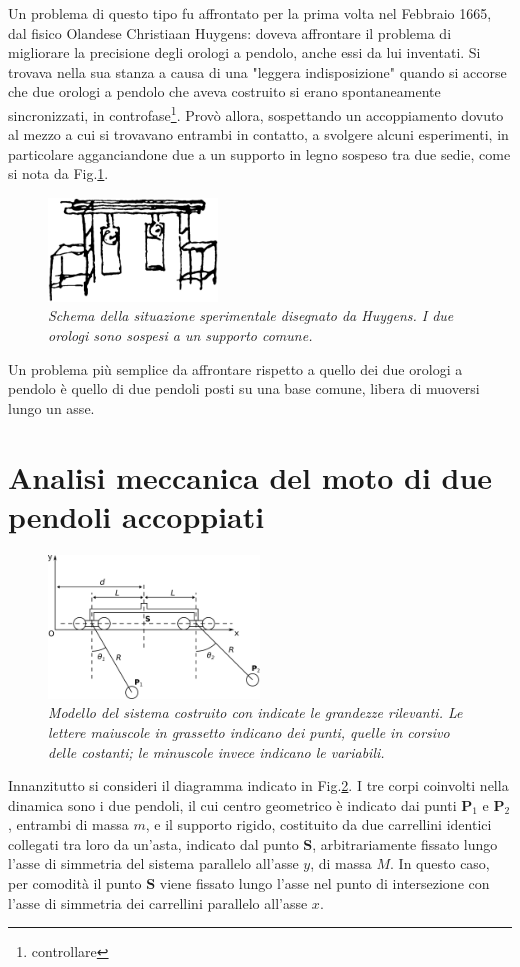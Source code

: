 \documentclass[11pt, a4paper, twoside]{article}
\begin{document}
Un problema di questo tipo fu affrontato per la prima volta nel Febbraio 1665, dal fisico Olandese Christiaan Huygens: doveva affrontare il problema di migliorare la precisione degli orologi a pendolo, anche essi da lui inventati. Si trovava nella sua stanza a causa di una "leggera indisposizione" quando si accorse che due orologi a pendolo che aveva costruito si erano spontaneamente sincronizzati, in controfase\footnote{controllare}. Provò allora, sospettando un accoppiamento dovuto al mezzo a cui si trovavano entrambi in contatto, a svolgere alcuni esperimenti, in particolare agganciandone due a un supporto in legno sospeso tra due sedie, come si nota da Fig.\ref{pendoli_huygens}.
\begin{figure}
    \centering
    \includegraphics[width=0.4\textwidth]{../../media/img/pendolums.png}
    \caption{\textit{Schema della situazione sperimentale disegnato da Huygens. I due orologi sono sospesi a un supporto comune.}}
    \label{pendoli_huygens}
\end{figure}
Un problema più semplice da affrontare rispetto a quello dei due orologi a pendolo è quello di due pendoli posti su una base comune, libera di muoversi lungo un asse.
\section{Analisi meccanica del moto di due pendoli accoppiati}
\begin{figure}[h]
    \centering
    \includegraphics[width=0.5\textwidth]{../../media/cad/sketch_2.pdf}
    \caption{\textit{Modello del sistema costruito con indicate
     le grandezze rilevanti. Le lettere maiuscole in grassetto indicano dei punti, quelle in corsivo delle 
     costanti; le minuscole invece indicano le variabili.} }
    \label{pendolicorpolibero}
\end{figure}
Innanzitutto si consideri il diagramma indicato in Fig.\ref{pendolicorpolibero}.
I tre corpi coinvolti nella dinamica sono i due pendoli, il cui centro 
geometrico è indicato dai punti $\mathbf{P}_1$ e $\mathbf{P}_2$, entrambi di massa $m$,
e il supporto rigido, costituito da due carrellini identici collegati tra loro da un'asta,
indicato dal punto $\mathbf{S}$, arbitrariamente fissato lungo l'asse di simmetria del sistema 
parallelo all'asse $y$, di massa $M$. In questo caso, per comodità il punto $\mathbf{S}$ 
viene fissato lungo l'asse nel punto di intersezione con l'asse di simmetria dei carrellini
parallelo all'asse $x$.
\end{document}
